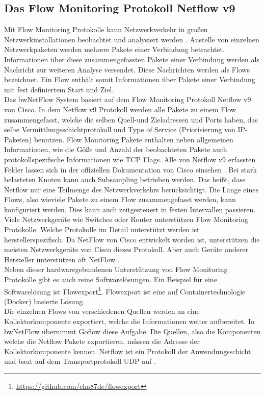 \documentclass[a4paper, 12pt]{article}
\begin{document}
\subsection{Das Flow Monitoring Protokoll Netflow v9}
Mit Flow Monitoring Protokolle kann Netzwerkverkehr in großen Netzwerkinstallationen beobachtet und analysiert werden \cite{version9flow}.
Anstelle von einzelnen Netzwerkpaketen werden mehrere Pakete einer Verbindung betrachtet.
Informationen über diese zusammengefassten Pakete einer Verbindung werden als Nachricht zur weiteren Analyse versendet.
Diese Nachrichten werden als Flows bezeichnet.
Ein Flow enthält somit Informationen über Pakete einer Verbindung mit fest definiertem Start und Ziel.
\\
Das bwNetFlow System basiert auf dem Flow Monitoring Protokoll Netflow v9 von Cisco.
In dem Netflow v9 Protokoll werden alle Pakete zu einem Flow zusammengefasst, welche die selben Quell-und Zieladressen und Ports haben,
das selbe Vermittlungsschichtprotokoll und Type of Service (Priorisierung von IP-Paketen) benutzen.
Flow Monitoring Pakete enthalten neben allgemeinen Informationen, wie die Göße und Anzahl der beobachteten Pakete auch protokollspezifische Informationen wie TCP Flags. Alle von Netflow v9 erfassten Felder lassen sich in der offiziellen Dokumentation von Cisco einsehen \cite{netflowconfig}.
Bei stark belasteten Knoten kann auch Subsampling betrieben werden. Das heißt, dass Netflow nur eine Teilmenge des Netzwerkverkehrs berücksichtigt.
Die Länge eines Flows, also wieviele Pakete zu einem Flow zusammengefasst werden, kann konfiguriert werden. 
Dies kann auch zeitgesteuert in festen Intervallen passieren.
\\
Viele Netzwerkgeräte wie Switches oder Router unterstützen Flow Monitoring Protokolle. Welche Protokolle im Detail unterstützt werden ist herstellerspezifisch.
Da NetFlow von Cisco entwickelt worden ist, unterstützen die meisten Netzwerkgeräte von Cisco dieses Protokoll.
Aber auch Geräte anderer Hersteller unterstützen oft NetFlow \cite{li2013survey}.
\\
Neben dieser hardwaregebundenen Unterstützung von Flow Monitoring Protokolle gibt es auch reine Softwarelösungen.
Ein Beispiel für eine Softwarelösung ist Flowexport\footnote{\url{https://github.com/cha87de/flowexport}}. Flowexport ist eine auf Containertechnologie (Docker) basierte Lösung.
\\
Die einzelnen Flows von verschiedenen Quellen werden an eine Kollektorkomponente exportiert, welche die Informationen weiter aufbereitet.
In bwNetFlow übernimmt Goflow diese Aufgabe.
Die Quellen, also die Komponenten welche die Netflow Pakete exportieren, müssen die Adresse der Kollektorkomponente kennen.
Netflow ist ein Protokoll der Anwendungsschicht und baut auf dem Transportprotokoll UDP auf \cite{netflowconfig}.
\end{document}
